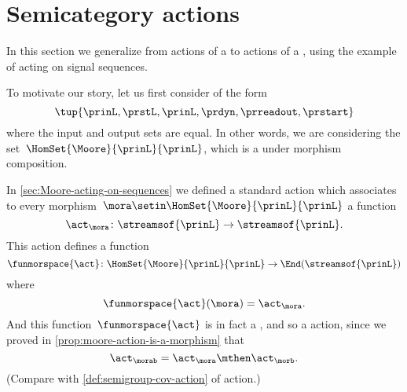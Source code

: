 
\section{Semicategory actions}
\label{sec:action-of-a-category}


In this section we generalize from actions of a  to actions of a , using the example of  acting on signal sequences.

To motivate our story, let us first consider  of the form
\begin{equation}
    \tup{\prinL,\prstL,\prinL,\prdyn,\prreadout,\prstart}
\end{equation}
where the input and output sets are equal.
In other words, we are considering the set~$\HomSet{\Moore}{\prinL}{\prinL}$, which is a  under morphism composition.

In \cref{sec:Moore-acting-on-sequences} we defined a standard action which associates to every morphism~$\mora \setin \HomSet{\Moore}{\prinL}{\prinL}$ a function
\begin{equation}
    \act_{\mora} \colon \streamsof{\prinL} \to \streamsof{\prinL}.
\end{equation}
This action defines a function
\begin{equation}
    \funmorspace{\act} \colon  \HomSet{\Moore}{\prinL}{\prinL} \to \End (\streamsof{\prinL})
\end{equation}
where
\begin{equation}
    \funmorspace{\act}(\mora) = \act_{\mora}.
\end{equation}
And this function~$\funmorspace{\act}$ is in fact a , and so a  action, since we proved in \cref{prop:moore-action-is-a-morphism} that
\begin{equation}
    \act_{\morab} = \act_\mora \mthen \act_\morb.
\end{equation}
(Compare with \cref{def:semigroup-cov-action} of  action.)

